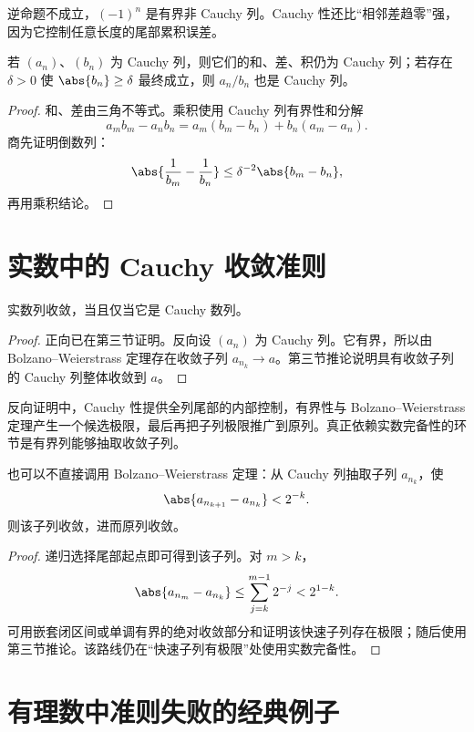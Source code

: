 逆命题不成立，\((-1)^n\) 是有界非 Cauchy 列。Cauchy 性还比“相邻差趋零”强，因为它控制任意长度的尾部累积误差。

\begin{proposition}
若 \((a_n)\)、\((b_n)\) 为 Cauchy 列，则它们的和、差、积仍为 Cauchy 列；若存在 \(\delta>0\) 使 \(\abs{b_n}\ge\delta\) 最终成立，则 \(a_n/b_n\) 也是 Cauchy 列。
\end{proposition}

\begin{proof}
和、差由三角不等式。乘积使用 Cauchy 列有界性和分解
\[
 a_mb_m-a_nb_n=a_m(b_m-b_n)+b_n(a_m-a_n).
\]
商先证明倒数列：
\[
 \abs{\frac1{b_m}-\frac1{b_n}}
 \le\delta^{-2}\abs{b_m-b_n},
\]
再用乘积结论。
\end{proof}

\section{实数中的 Cauchy 收敛准则}

\begin{theorem}
实数列收敛，当且仅当它是 Cauchy 数列。
\end{theorem}

\begin{proof}
正向已在第三节证明。反向设 \((a_n)\) 为 Cauchy 列。它有界，所以由 Bolzano--Weierstrass 定理存在收敛子列 \(a_{n_k}\to a\)。第三节推论说明具有收敛子列的 Cauchy 列整体收敛到 \(a\)。
\end{proof}

反向证明中，Cauchy 性提供全列尾部的内部控制，有界性与 Bolzano--Weierstrass 定理产生一个候选极限，最后再把子列极限推广到原列。真正依赖实数完备性的环节是有界列能够抽取收敛子列。

\begin{theorem}[快速子列证明]
也可以不直接调用 Bolzano--Weierstrass 定理：从 Cauchy 列抽取子列 \(a_{n_k}\)，使
\[
 \abs{a_{n_{k+1}}-a_{n_k}}<2^{-k}.
\]
则该子列收敛，进而原列收敛。
\end{theorem}

\begin{proof}
递归选择尾部起点即可得到该子列。对 \(m>k\)，
\[
 \abs{a_{n_m}-a_{n_k}}
 \le\sum_{j=k}^{m-1}2^{-j}<2^{1-k}.
\]
可用嵌套闭区间或单调有界的绝对收敛部分和证明该快速子列存在极限；随后使用第三节推论。该路线仍在“快速子列有极限”处使用实数完备性。
\end{proof}

\section{有理数中准则失败的经典例子}

